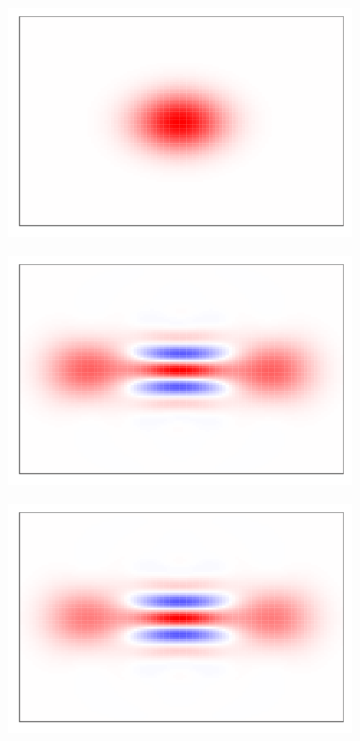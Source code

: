 \begin{figure}[t]
     \centering
     \begin{subfigure}[b]{0.32\textwidth}
         \centering
         \includegraphics[width=\textwidth]{figures/ground.pdf}
         \caption{}
         \label{fig:ground}
     \end{subfigure}
     \hfill
     \begin{subfigure}[b]{0.32\textwidth}
         \centering
         \includegraphics[width=\textwidth]{figures/initialized_cat.pdf}
         \caption{}
         \label{fig:initialized_cat}
     \end{subfigure}
     \hfill
     \begin{subfigure}[b]{0.32\textwidth}
         \centering
         \includegraphics[width=\textwidth]{figures/ideal_cat.pdf}

\end{subfigure}
\end{figure}

